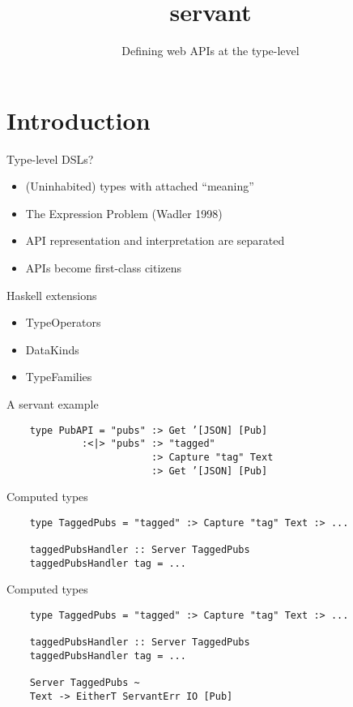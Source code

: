 \documentclass[12pt]{beamer}
\title{servant}
\subtitle{Defining web APIs at the type-level}
\begin{document}


\maketitle

\section{Introduction}

\begin{frame}{Type-level DSLs?}
  \begin{itemize}
  \item (Uninhabited) types with attached ``meaning''
  \item The Expression Problem (Wadler 1998)
  \item API representation and interpretation are separated
  \item APIs become first-class citizens
  \end{itemize}
\end{frame}

\begin{frame}{Haskell extensions}
  \begin{itemize}
  \item TypeOperators
  \item DataKinds
  \item TypeFamilies
  \end{itemize}
\end{frame}

\begin{frame}[fragile]{A servant example}
  \begin{verbatim}
    type PubAPI = "pubs" :> Get ’[JSON] [Pub]
             :<|> "pubs" :> "tagged"
                         :> Capture "tag" Text
                         :> Get ’[JSON] [Pub]
  \end{verbatim}
\end{frame}

\begin{frame}[fragile]{Computed types}
  \begin{verbatim}
    type TaggedPubs = "tagged" :> Capture "tag" Text :> ...

    taggedPubsHandler :: Server TaggedPubs
    taggedPubsHandler tag = ...
  \end{verbatim}
\end{frame}

\begin{frame}[fragile]{Computed types}
  \begin{verbatim}
    type TaggedPubs = "tagged" :> Capture "tag" Text :> ...

    taggedPubsHandler :: Server TaggedPubs
    taggedPubsHandler tag = ...

    Server TaggedPubs ~
    Text -> EitherT ServantErr IO [Pub]
  \end{verbatim}
\end{frame}
\end{document}
